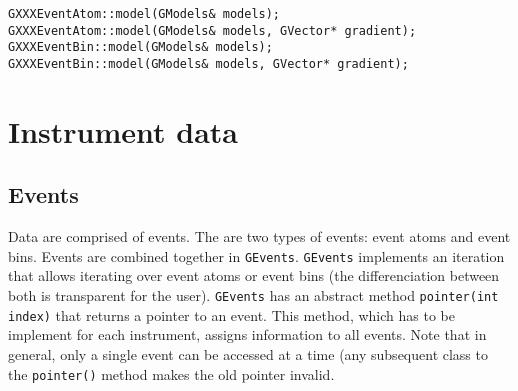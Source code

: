 \documentclass{article}[12pt,a4]
\begin{document}
\begin{verbatim}
GXXXEventAtom::model(GModels& models);
GXXXEventAtom::model(GModels& models, GVector* gradient);
GXXXEventBin::model(GModels& models);
GXXXEventBin::model(GModels& models, GVector* gradient);
\end{verbatim}


\section{Instrument data}

\subsection{Events}

Data are comprised of events.
The are two types of events: event atoms and event bins.
Events are combined together in {\tt GEvents}.
{\tt GEvents} implements an iteration that allows iterating over event atoms or event bins
(the differenciation between both is transparent for the user).
{\tt GEvents} has an abstract method {\tt pointer(int index)} that returns a pointer to an
event.
This method, which has to be implement for each instrument, assigns information to
all events.
Note that in general, only a single event can be accessed at a time (any subsequent
class to the {\tt pointer()} method makes the old pointer invalid.
\end{document}
